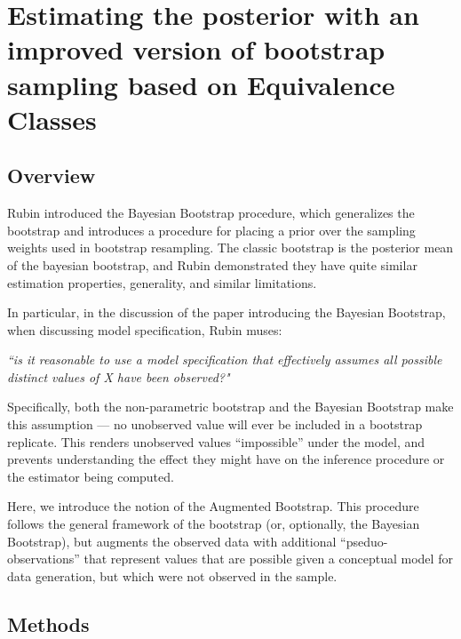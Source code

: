 
\renewcommand{\thechapter}{4}

\chapter[Improving the Posterior Estimates]{Estimating the posterior with an improved 
version of bootstrap sampling based on Equivalence Classes} 
\label{chapt:boots}

\section{Overview}
Rubin \cite{rubin1981bayesian} introduced the Bayesian Bootstrap procedure, which generalizes 
the bootstrap and introduces a procedure for placing a prior over the sampling weights used in 
bootstrap resampling. The classic bootstrap is the posterior mean of the bayesian bootstrap, and 
Rubin demonstrated they have quite similar estimation properties, generality, and similar 
limitations.

In particular, in the discussion of the paper introducing the Bayesian Bootstrap, when 
discussing model specification, Rubin muses:

\textit{``is it reasonable to use a model specification that effectively assumes all possible distinct 
values of X have been observed?"}

Specifically, both the non-parametric bootstrap and the Bayesian Bootstrap make this assumption — 
no unobserved value will ever be included in a bootstrap replicate. This renders unobserved 
values “impossible” under the model, and prevents understanding the effect they might have on 
the inference procedure or the estimator being computed.

Here, we introduce the notion of the Augmented Bootstrap. This procedure follows the general 
framework of the bootstrap (or, optionally, the Bayesian Bootstrap), but augments the observed 
data with additional “pseduo-observations” that represent values that are possible given a 
conceptual model for data generation, but which were not observed in the sample.

\section{Methods}

